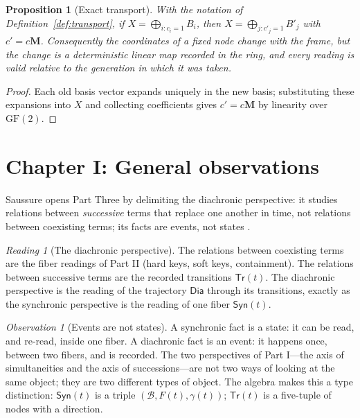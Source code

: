 \documentclass[11pt,a4paper]{article}
\newtheorem{proposition}[principle]{Proposition}
\theoremstyle{remark}
\newtheorem{observation}[principle]{Observation}
\newtheorem{reading}[principle]{Reading}
\newcommand{\Lat}{\ensuremath{\mathcal{B}}}              %
\newcommand{\Sync}{\ensuremath{\mathsf{Syn}}}            %
\newcommand{\Dia}{\ensuremath{\mathsf{Dia}}}             %
\newcommand{\Gen}{\ensuremath{\gamma}}                   %
\newcommand{\Trans}{\ensuremath{\mathsf{Tr}}}            %
\newcommand{\Change}{\ensuremath{\mathbf{M}}}            %
\begin{document}
\begin{proposition}[Exact transport]
\label{prop:transport}
With the notation of Definition~\ref{def:transport}, if
$X = \bigoplus_{i:c_i=1} B_i$, then
$X = \bigoplus_{j:c'_j=1} B'_j$ with $c' = c\Change$. Consequently the
coordinates of a fixed node change with the frame, but the change is a
deterministic linear map recorded in the ring, and every reading is valid
relative to the generation in which it was taken.
\end{proposition}

\begin{proof}
Each old basis vector expands uniquely in the new basis; substituting these
expansions into $X$ and collecting coefficients gives $c' = c\Change$ by
linearity over $\mathrm{GF}(2)$.
\end{proof}

\section{Chapter I: General observations}
\label{sec:ch1}

Saussure opens Part Three by delimiting the diachronic perspective: it studies
relations between \emph{successive} terms that replace one another in time,
not relations between coexisting terms; its facts are events, not states
\cite[Part III, ch.~I]{harris1983}.

\begin{reading}[The diachronic perspective]
\label{read:ch1}
The relations between coexisting terms are the fiber readings of Part II
(hard keys, soft keys, containment). The relations between successive terms
are the recorded transitions $\Trans(t)$. The diachronic perspective is the
reading of the trajectory $\Dia$ through its transitions, exactly as the
synchronic perspective is the reading of one fiber $\Sync(t)$.
\end{reading}

\begin{observation}[Events are not states]
\label{obs:events}
A synchronic fact is a state: it can be read, and re-read, inside one fiber.
A diachronic fact is an event: it happens once, between two fibers, and is
recorded. The two perspectives of Part I---the axis of simultaneities and the
axis of successions---are not two ways of looking at the same object; they
are two different types of object. The algebra makes this a type distinction:
$\Sync(t)$ is a triple $(\Lat, F(t), \Gen(t))$; $\Trans(t)$ is a five-tuple
of nodes with a direction.
\end{observation}
\end{document}
